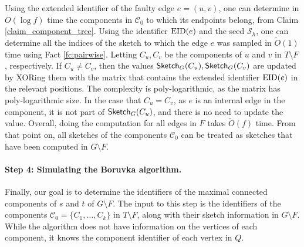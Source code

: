 Using the extended identifier of the faulty edge $e=(u,v)$, one can determine in $O(\log{f})$ time the components in $\mathcal{C}_0$ to which its endpoints belong, from Claim \ref{claim_component_tree}. Using the identifier $\operatorname{EID}(e)$ and the seed $\mathcal{S}_h$, one can determine all the indices of the sketch to which the edge $e$ was sampled in $\widetilde{O}(1)$ time using Fact \ref{fc:pairwise}. %
Letting $C_u, C_v$ be the components of $u$ and $v$ in $T \setminus F$, respectively. If $C_u \neq C_v$, then the values $\mathsf{Sketch}_G(C_u),\mathsf{Sketch}_G(C_v)$ are updated by XORing them with the matrix that contains the extended identifier $\operatorname{EID}(e)$ in the relevant positions. The complexity is poly-logarithmic, as the matrix has poly-logarithmic size. In the case that $C_u=C_v$, as $e$ is an internal edge in the component, it is not part of $\mathsf{Sketch}_G(C_u)$, and there is no need to update the value. Overall, doing the computation for all edges in $F$ takes $\widetilde{O}(f)$ time.
From that point on, all sketches of the components $\mathcal{C}_0$ can be treated as sketches that have been computed in $G \setminus F$.  


\paragraph{Step 4: Simulating the Boruvka algorithm.} Finally, our goal is to determine the identifiers of the maximal connected components of $s$ and $t$ of $G \setminus F$. The input to this step is the identifiers of the components $\mathcal{C}_0=\{C_{1}, \ldots, C_k\}$ in $T \setminus F$, along with their sketch information in $G \setminus F$. While the algorithm does not have information on the vertices of each component, it knows the component identifier of each vertex in $Q$. 

